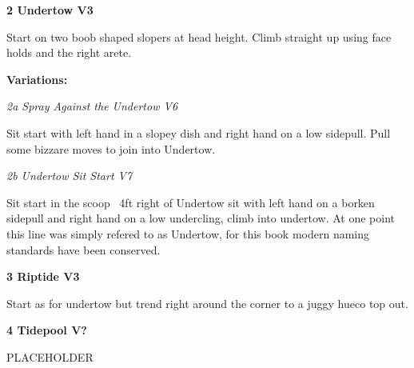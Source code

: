 \begin{multicols}{2}
					\begin{minipage}{\linewidth}	
					\label{rt:Undertow}\colorbox{green!20}{\textbf{2 Undertow V3 \ding{72}    }}
					\begin{adjustwidth}{0.5cm}{}				
					Start on two boob shaped slopers at head height. Climb straight up using face holds and the right arete.
					\end{adjustwidth}
					\end{minipage}
						\begin{adjustwidth}{0.5cm}{}				
						\textbf{Variations:} \newline
							\begin{minipage}{\linewidth}	
							\label{vr:Spray Against the Undertow}\colorbox{RoyalBlue!20}{\emph{2a Spray Against the Undertow V6  }}
							\begin{adjustwidth}{0.5cm}{}				
							Sit start with left hand in a slopey dish and right hand on a low sidepull. Pull some bizzare moves to join into Undertow.
							\end{adjustwidth}
							\end{minipage}
							\begin{minipage}{\linewidth}	
							\label{vr:Undertow Sit Start}\colorbox{Goldenrod!50}{\emph{2b Undertow Sit Start V7  \ding{72}   }}
							\begin{adjustwidth}{0.5cm}{}				
							Sit start in the scoop ~4ft right of Undertow sit with left hand on a borken sidepull and right hand on a low undercling, climb into undertow. At one point this line was simply refered to as Undertow, for this book modern naming standards have been conserved.
							\end{adjustwidth}
							\end{minipage}
						\end{adjustwidth}
					\begin{minipage}{\linewidth}	
					\label{rt:Riptide}\colorbox{green!20}{\textbf{3 Riptide V3 \ding{72}   }}
					\begin{adjustwidth}{0.5cm}{}				
					Start as for undertow but trend right around the corner to a juggy hueco top out.
					\end{adjustwidth}
					\end{minipage}
					\begin{minipage}{\linewidth}	
					\label{rt:Tidepool}\colorbox{black!20}{\textbf{4 Tidepool V?  }}
					\begin{adjustwidth}{0.5cm}{}				
					PLACEHOLDER
					\end{adjustwidth}
					\end{minipage}

\end{multicols}
